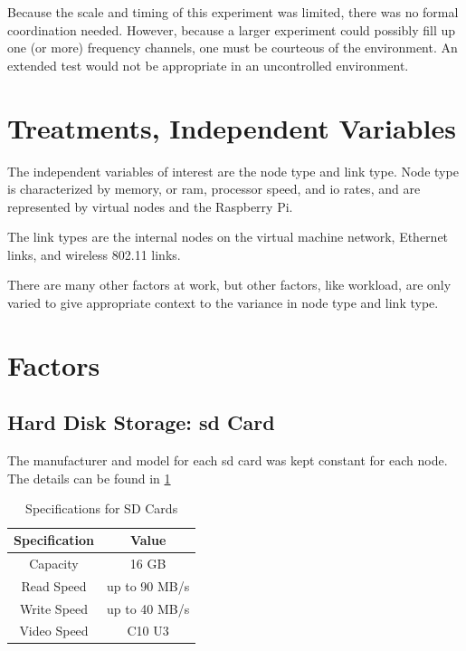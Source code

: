 Because the scale and timing of this experiment was limited, there was no formal coordination needed.  However, because a larger experiment could possibly fill up one (or more) frequency channels, one must be courteous of the environment.  An extended test would not be appropriate in an uncontrolled environment.

\section{Treatments, Independent Variables}

The independent variables of interest are the node type and link type.  Node type is characterized by memory, or \gls{ram}, processor speed, and \gls{io} rates, and are represented by virtual nodes and the Raspberry Pi.

The link types are the internal nodes on the virtual machine network, Ethernet links, and wireless 802.11 links.

There are many other factors at work, but other factors, like workload, are only varied to give appropriate context to the variance in node type and link type. 

\section{Factors}

\subsection{Hard Disk Storage: \gls{sd} Card}

The manufacturer and model for each \gls{sd} card was kept constant for each node.  The details can be found in \ref{table:sd_card_specs}

\begin{table}
\begin{center}
 \begin{tabular}{||c c||} 
 \hline
 Specification & Value \\ [0.5ex] 
 \hline\hline
 Capacity & 16 GB \\ 
 \hline
 Read Speed & up to 90 MB/s \\
 \hline
 Write Speed & up to 40 MB/s \\ 
 \hline
 Video Speed & C10 U3 \\ [1ex] 
 \hline
\end{tabular}
\end{center}

\caption{Specifications for SD Cards \cite{SanDiskCard}}
\label{table:sd_card_specs}
\end{table}


